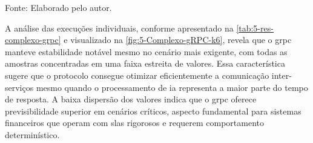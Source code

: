 \begin{table}[H]
\centering
\caption{\gls{grpc} comparado com os demais protocolos — Cenário Complexo (Thrift/\gls{rest} em $\Delta$\% vs \gls{grpc})}
\label{tab:5-res-complexo-grpc}
{\par \raggedright \footnotesize Fonte: Elaborado pelo autor.\par}
\end{table}

A análise das execuções individuais, conforme apresentado na \autoref{tab:5-res-complexo-grpc} e visualizado na \autoref{fig:5-Complexo-gRPC-k6}, revela que o \gls{grpc} manteve estabilidade notável mesmo no cenário mais exigente, com todas as amostras concentradas em uma faixa estreita de valores. Essa característica sugere que o protocolo consegue otimizar eficientemente a comunicação inter-serviços mesmo quando o processamento de \gls{ia} representa a maior parte do tempo de resposta. A baixa dispersão dos valores indica que o \gls{grpc} oferece previsibilidade superior em cenários críticos, aspecto fundamental para sistemas financeiros que operam com \acrshort{sla}s rigorosos e requerem comportamento determinístico.

